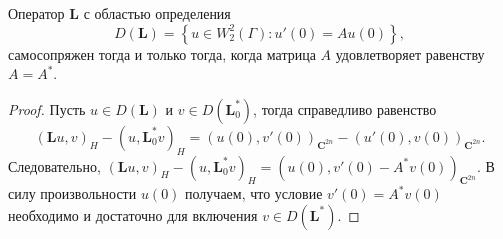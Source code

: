 \begin{theorem}
Оператор $\textbf{L}$ с областью определения 
$$D(\textbf{L}) = \left\{ u \in W_2^2(\Gamma): u'(0) = A u(0) \right\},$$
самосопряжен тогда и только тогда, когда матрица $A$ удовлетворяет равенству $A = A^*$.
\end{theorem} 
\begin{proof}
Пусть $u \in D(\textbf{L})$ и $v \in D(\textbf{L}_0^*)$, тогда справедливо равенство 
$$\left(\textbf{L} u, v \right)_H - \left(u, \textbf{L}_0^*v \right)_H = \left(u(0), v'(0)\right)_{\mathbf{C}^{2n}} - \left(u'(0), v(0)\right)_{\mathbf{C}^{2n}}.$$
Следовательно, $\left(\textbf{L} u, v \right)_H - \left(u, \textbf{L}_0^*v \right)_H = \left(u(0), v'(0) - A^* v(0)\right)_{\mathbf{C}^{2n}}$.
В силу произвольности $u(0)$ получаем, что условие $v'(0) = A^* v(0)$ необходимо и достаточно для включения $v \in D(\textbf{L}^*)$.
\end{proof}


